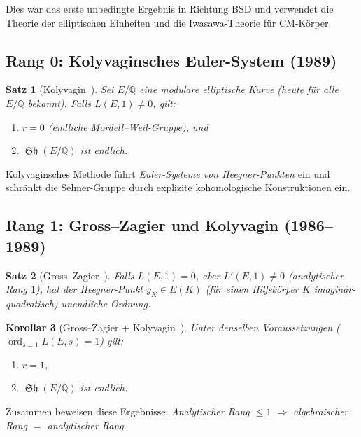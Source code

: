 \documentclass[12pt,a4paper]{article}
\newtheorem{theorem}{Satz}[section]
\newtheorem{corollary}[theorem]{Korollar}
\theoremstyle{remark}
\DeclareMathOperator{\Sha}{\mathfrak{Sh}}
\begin{document}
Dies war das erste unbedingte Ergebnis in Richtung BSD und verwendet die Theorie der
elliptischen Einheiten und die Iwasawa-Theorie für CM-Körper.

\subsection{Rang 0: Kolyvaginsches Euler-System (1989)}

\begin{theorem}[Kolyvagin~\cite{Kolyvagin1989}]
  Sei $E/\mathbb{Q}$ eine modulare elliptische Kurve (heute für alle $E/\mathbb{Q}$
  bekannt). Falls $L(E,1) \neq 0$, gilt:
  \begin{enumerate}[nosep]
    \item $r = 0$ (endliche Mordell--Weil-Gruppe), und
    \item $\Sha(E/\mathbb{Q})$ ist endlich.
  \end{enumerate}
\end{theorem}

Kolyvaginsches Methode führt \emph{Euler-Systeme von Heegner-Punkten} ein und schränkt
die Selmer-Gruppe durch explizite kohomologische Konstruktionen ein.

\subsection{Rang 1: Gross--Zagier und Kolyvagin (1986--1989)}

\begin{theorem}[Gross--Zagier~\cite{GrossZagier1986}]
  Falls $L(E,1) = 0$, aber $L'(E,1) \neq 0$ (analytischer Rang $1$), hat der
  Heegner-Punkt $y_K \in E(K)$ (für einen Hilfskörper $K$ imaginär-quadratisch) unendliche
  Ordnung.
\end{theorem}

\begin{corollary}[Gross--Zagier + Kolyvagin~\cite{Kolyvagin1989}]
  Unter denselben Voraussetzungen ($\operatorname{ord}_{s=1} L(E,s) = 1$) gilt:
  \begin{enumerate}[nosep]
    \item $r = 1$,
    \item $\Sha(E/\mathbb{Q})$ ist endlich.
  \end{enumerate}
\end{corollary}

Zusammen beweisen diese Ergebnisse: \emph{Analytischer Rang $\leq 1$ $\Rightarrow$ algebraischer Rang $=$ analytischer Rang}.
\end{document}
